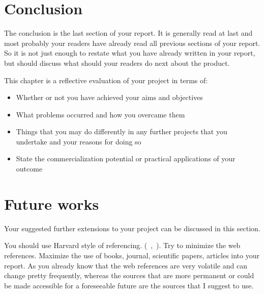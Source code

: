 \documentclass[12pt, a4paper]{report}
\begin{document}







\chapter{Conclusion} %
\label{cha:conclusion}

The conclusion is the last section of your report. It is generally read at last and most probably your readers have already read all previous sections of your report. So it is not just enough to restate what you have already written in your report, but should discuss what should your readers do next about the product.

This chapter is a reflective evaluation of your project in terms of:
\begin{itemize}
  \item Whether or not you have achieved your aims and objectives
  \item What problems occurred and how you overcame them
  \item Things that you may do differently in any further projects that you undertake and your reasons for doing so
  \item State the commercialization potential or practical applications of your outcome
\end{itemize}

\chapter{Future works} %
\label{cha:future_works}
Your suggested further extensions to your project can be discussed in this section.


You should use Harvard style of referencing. (~\cite{dawson2005projects},~\cite{weaver2004success}). Try to minimize the web references. Maximize the use of books, journal, scientific papers, articles into your report. As you already know that the web references are very volatile and can change pretty frequently, whereas the sources that are more permanent or could be made accessible for a foreseeable future are the sources that I suggest to use.

\printbibliography
\end{document}
